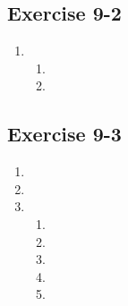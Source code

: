 \subsection{Exercise 9-2} %
  \begin{enumerate}[itemsep=5pt, label=\textbf{\arabic*}. ]
 \item %
   \begin{enumerate}[noitemsep, label=\textbf{(\alph*)} ]
\item

  \item %
\end{enumerate}
\end{enumerate}
\subsection{Exercise 9-3} %
  \begin{enumerate}[itemsep=8pt, label=\textbf{\arabic*}.]

  \item %

  \item %

\item %
\begin{enumerate}[noitemsep, label=\textbf{(\alph*)} ]
\item %
\item %
\item %
\item %
\item %
\end{enumerate}

  \end{enumerate}



